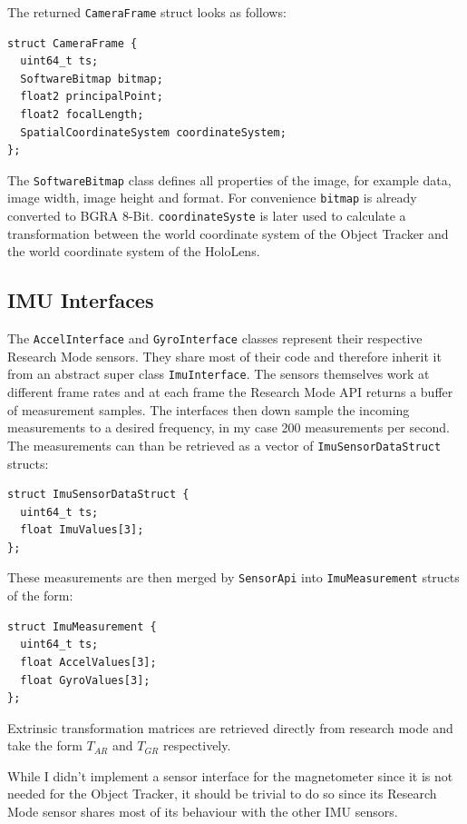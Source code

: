 The returned \lstinline{CameraFrame} struct looks as follows:

\begin{lstlisting}
struct CameraFrame {
  uint64_t ts;
  SoftwareBitmap bitmap;
  float2 principalPoint;
  float2 focalLength;
  SpatialCoordinateSystem coordinateSystem;
};
\end{lstlisting}

The \lstinline{SoftwareBitmap} class defines all properties of the image, for example data, image width, image height and format. For convenience \lstinline{bitmap} is already converted to BGRA 8-Bit. \lstinline{coordinateSyste} is later used to calculate a transformation between the world coordinate system of the Object Tracker and the world coordinate system of the HoloLens.

\subsection{IMU Interfaces}

The \lstinline{AccelInterface} and \lstinline{GyroInterface} classes represent their respective Research Mode sensors. They share most of their code and therefore inherit it from an abstract super class \lstinline{ImuInterface}. The sensors themselves work at different frame rates and at each frame the Research Mode API returns a buffer of measurement samples. The interfaces then down sample the incoming measurements to a desired frequency, in my case 200 measurements per second. The measurements can than be retrieved as a vector of \lstinline{ImuSensorDataStruct} structs:

\begin{lstlisting}
struct ImuSensorDataStruct {
  uint64_t ts;
  float ImuValues[3];
};
\end{lstlisting}

These measurements are then merged by \lstinline{SensorApi} into \lstinline{ImuMeasurement} structs of the form:

\begin{lstlisting}
struct ImuMeasurement {
  uint64_t ts;
  float AccelValues[3];
  float GyroValues[3];
};
\end{lstlisting}

Extrinsic transformation matrices are retrieved directly from research mode and take the form $T_{AR}$ and $T_{GR}$ respectively.

While I didn't implement a sensor interface for the magnetometer since it is not needed for the Object Tracker, it should be trivial to do so since its Research Mode sensor shares most of its behaviour with the other IMU sensors.


